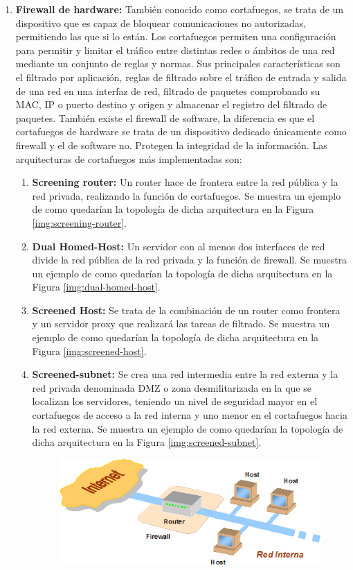 \begin{enumerate}
\item {\bfseries Firewall de hardware:}
También conocido como cortafuegos, se trata de un dispositivo que es capaz de bloquear comunicaciones no autorizadas, permitiendo las que si lo están. Los cortafuegos permiten una configuración para permitir y limitar el tráfico entre distintas redes o ámbitos de una red mediante un conjunto de reglas y normas. Sus principales características son el filtrado por aplicación, reglas de filtrado sobre el tráfico de entrada y salida de una red en una interfaz de red, filtrado de paquetes comprobando su MAC, IP o puerto destino y origen y almacenar el registro del filtrado de paquetes. También existe el firewall de software, la diferencia es que el cortafuegos de hardware se trata de un dispositivo dedicado únicamente como firewall y el de software no. Protegen la integridad de la información.  Las arquitecturas de cortafuegos más implementadas son:
\begin{enumerate}
\item {\bfseries Screening router:}
 Un router hace de frontera entre la red pública y la red privada, realizando la función de cortafuegos. Se muestra un ejemplo de como quedarían la topología de dicha arquitectura en la Figura \ref{img:screening-router}.
\item {\bfseries Dual Homed-Host:}
Un servidor con al menos dos interfaces de red divide la red pública de la red privada y la función de firewall. Se muestra un ejemplo de como quedarían la topología de dicha arquitectura en la Figura \ref{img:dual-homed-host}.
\item {\bfseries Screened Host:}
Se trata de la combinación de un router como frontera y un servidor proxy que realizará las tareas de filtrado. Se muestra un ejemplo de como quedarían la topología de dicha arquitectura en la Figura \ref{img:screened-host}.
\item {\bfseries Screened-subnet:}
Se crea una red intermedia entre la red externa y la red privada denominada DMZ o zona desmilitarizada en la que se localizan los servidores, teniendo un nivel de seguridad mayor en el cortafuegos de acceso a la red interna y uno menor en el cortafuegos hacia la red externa. Se muestra un ejemplo de como quedarían la topología de dicha arquitectura en la Figura \ref{img:screened-subnet}.
\begin{figure}[tphb]
  		   \centering
     		   \includegraphics[width=5in]{screening-router.png}

\end{figure}
\end{enumerate}
\end{enumerate}
